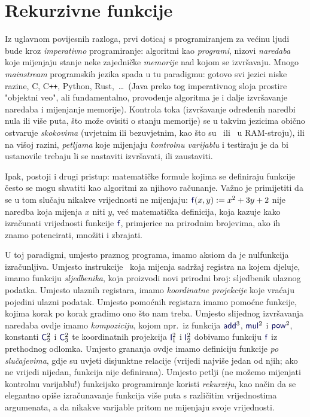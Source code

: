 \chapter{Rekurzivne funkcije}\label{ch:rek}

Iz uglavnom povijesnih razloga, prvi doticaj s programiranjem za većinu ljudi bude kroz \emph{imperativno} programiranje: algoritmi kao \emph{programi}, nizovi \emph{naredaba} koje mijenjaju stanje neke zajedničke \emph{memorije} nad kojom se izvršavaju. Mnogo \emph{mainstream} programskih jezika spada u tu paradigmu: gotovo svi jezici niske razine, C, C\texttt{++}, Python, Rust,~\ldots\ (Java preko tog imperativnog sloja prostire "objektni veo", ali fundamentalno, provođenje algoritma je i dalje izvršavanje naredaba i mijenjanje memorije). Kontrola toka (izvršavanje određenih naredbi nula ili više puta, što može ovisiti o stanju memorije) se u takvim jezicima obično ostvaruje \emph{skokovima} (uvjetnim ili bezuvjetnim, kao što su \dec\ ili \goto\ u RAM-stroju), ili na višoj razini, \emph{petljama} koje mijenjaju \emph{kontrolnu varijablu} i testiraju je da bi ustanovile trebaju li se nastaviti izvršavati, ili zaustaviti.

Ipak, postoji i drugi pristup: matematičke formule kojima se definiraju funkcije često se mogu shvatiti kao algoritmi za njihovo računanje. Važno je primijetiti da se u tom slučaju nikakve vrijednosti ne mijenjaju: $\f f(x,y):=x^2+3y+2$ nije naredba koja mijenja $x$ niti $y$, već matematička definicija, koja kazuje kako izračunati vrijednosti funkcije $\f f$, primjerice na prirodnim brojevima, ako ih znamo potencirati, množiti i zbrajati.

U toj paradigmi, umjesto praznog programa, imamo aksiom da je nulfunkcija izračunljiva. Umjesto instrukcije \inc\ koja mijenja sadržaj registra na kojem djeluje, imamo funkciju \emph{sljedbenika}, koja proizvodi novi prirodni broj: sljedbenik ulaznog podatka. Umjesto ulaznih registara, imamo \emph{koordinatne projekcije} koje vraćaju pojedini ulazni podatak. Umjesto pomoćnih registara imamo pomoćne funkcije, kojima korak po korak gradimo ono što nam treba. Umjesto slijednog izvršavanja naredaba ovdje imamo \emph{kompoziciju}, kojom npr.\ iz funkcija $\f{add}^3$, $\f{mul}^2$ i $\f{pow}^2$, konstanti $\f C_2^2$ i $\f C_3^2$ te koordinatnih projekcija $\f I_1^2$ i $\f I_2^2$ dobivamo funkciju $\f f$ iz prethodnog odlomka. Umjesto grananja ovdje imamo definiciju funkcije \emph{po slučajevima}, gdje su uvjeti disjunktne relacije (vrijedi najviše jedan od njih; ako ne vrijedi nijedan, funkcija nije definirana). Umjesto petlji (ne možemo mijenjati kontrolnu varijablu!) funkcijsko programiranje koristi \emph{rekurziju}, kao način da se elegantno opiše izračunavanje funkcija više puta s različitim vrijednostima argumenata, a da nikakve varijable pritom ne mijenjaju svoje vrijednosti. 

